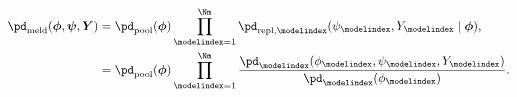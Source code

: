 \begin{align}
  \pd_{\text{meld}}(\boldsymbol{\phi}, \boldsymbol{\psi}, \boldsymbol{Y}) &=
    \pd_{\text{pool}}(\boldsymbol{\phi})
    \prod_{\modelindex = 1}^{\Nm}
      \pd_{\text{repl}, \modelindex}(\psi_{\modelindex}, Y_{\modelindex} \mid \boldsymbol{\phi}), \\
    &=
    \pd_{\text{pool}}(\boldsymbol{\phi})
    \prod_{\modelindex =1}^{\Nm}
    \frac {
      \pd_{\modelindex}(\phi_{\modelindex}, \psi_{\modelindex}, Y_{\modelindex})
    } {
      \pd_{\modelindex}(\phi_{\modelindex})
    }.
  \label{eqn:melded-model-full}
\end{align}